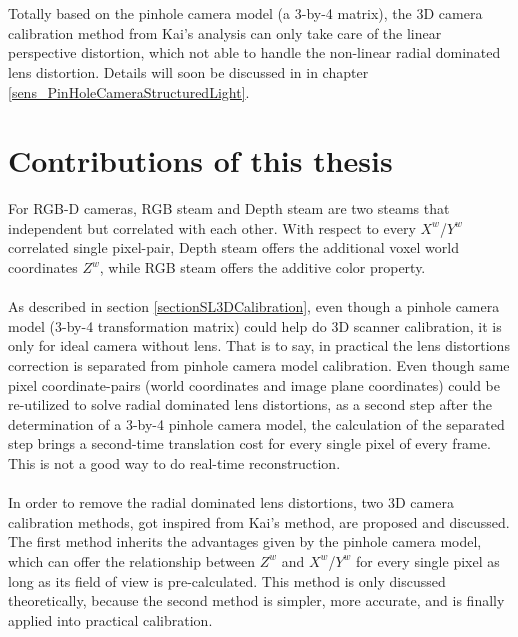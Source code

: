 \\\\%
Totally based on the pinhole camera model (a 3-by-4 matrix), the 3D camera calibration method from Kai's analysis can only take care of the linear perspective distortion, which not able to handle the non-linear radial dominated lens distortion. Details will soon be discussed in in chapter \ref{sens_PinHoleCameraStructuredLight}. %
%
%
%
\section{Contributions of this thesis}
For RGB-D cameras, RGB steam and Depth steam are two steams that independent but correlated with each other. With respect to every \(X^{w}\)/\(Y^{w}\) correlated single pixel-pair, Depth steam offers the additional voxel world coordinates \(Z^{w}\), while RGB steam offers the additive color property.
\\
\\As described in section \ref{sectionSL3DCalibration}, even though a pinhole camera model (3-by-4 transformation matrix) could help do 3D scanner calibration, it is only for ideal camera without lens. That is to say, in practical the lens distortions correction is separated from pinhole camera model calibration. Even though same pixel coordinate-pairs (world coordinates and image plane coordinates) could be re-utilized to solve radial dominated lens distortions, as a second step after the determination of a 3-by-4 pinhole camera model, the calculation of the separated step brings a second-time translation cost for every single pixel of every frame. This is not a good way to do real-time reconstruction. %
\\\\%
In order to remove the radial dominated lens distortions, two 3D camera calibration methods, got inspired from Kai's method, are proposed and discussed. The first method inherits the advantages given by the pinhole camera model, which can offer the relationship between \(Z^{w}\) and \(X^{w}\)/\(Y^{w}\) for every single pixel as long as its field of view is pre-calculated. This method is only discussed theoretically, because the second method is simpler, more accurate, and is finally applied into practical calibration.%
